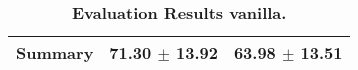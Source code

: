 \begin{table}[htb]
{\begin{tabular}{lll}
\midrule
\textbf{Summary                                  } &                  \phantom{0}71.30 $\pm$ 13.92 &                      \phantom{0}63.98 $\pm$ 13.51 \\
\bottomrule
\end{tabular}%
}
\caption{\textbf{Evaluation Results vanilla.}}
\label{tab:eval-results}
\end{table}
